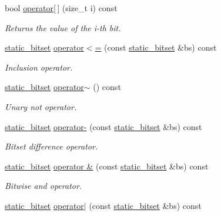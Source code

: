 \begin{DoxyCompactItemize}
\mbox{\label{classlgraph_1_1utils_1_1static__bitset_ac992361d2d5264ce8382f2e44ee939fb}} 
bool \hyperlink{classlgraph_1_1utils_1_1static__bitset_ac992361d2d5264ce8382f2e44ee939fb}{operator\mbox{[}$\,$\mbox{]}} (size\+\_\+t i) const
\begin{DoxyCompactList}\small\item\em Returns the value of the i-\/th bit. \end{DoxyCompactList}\item 
\hyperlink{classlgraph_1_1utils_1_1static__bitset}{static\+\_\+bitset} \hyperlink{classlgraph_1_1utils_1_1static__bitset_a633df0acba7afd646bbbef1acd85ca49}{operator$<$=} (const \hyperlink{classlgraph_1_1utils_1_1static__bitset}{static\+\_\+bitset} \&bs) const
\begin{DoxyCompactList}\small\item\em Inclusion operator. \end{DoxyCompactList}\item 
\hyperlink{classlgraph_1_1utils_1_1static__bitset}{static\+\_\+bitset} \hyperlink{classlgraph_1_1utils_1_1static__bitset_a8bb49442a841f4a899f355fb278a9468}{operator$\sim$} () const
\begin{DoxyCompactList}\small\item\em Unary not operator. \end{DoxyCompactList}\item 
\hyperlink{classlgraph_1_1utils_1_1static__bitset}{static\+\_\+bitset} \hyperlink{classlgraph_1_1utils_1_1static__bitset_ab7ab47c906e9e08a61a48bb935594e90}{operator-\/} (const \hyperlink{classlgraph_1_1utils_1_1static__bitset}{static\+\_\+bitset} \&bs) const
\begin{DoxyCompactList}\small\item\em Bitset difference operator. \end{DoxyCompactList}\item 
\hyperlink{classlgraph_1_1utils_1_1static__bitset}{static\+\_\+bitset} \hyperlink{classlgraph_1_1utils_1_1static__bitset_ade4bed9c986a5f328535c133bfa8eee7}{operator \&} (const \hyperlink{classlgraph_1_1utils_1_1static__bitset}{static\+\_\+bitset} \&bs) const
\begin{DoxyCompactList}\small\item\em Bitwise {\itshape and} operator. \end{DoxyCompactList}\item 
\hyperlink{classlgraph_1_1utils_1_1static__bitset}{static\+\_\+bitset} \hyperlink{classlgraph_1_1utils_1_1static__bitset_a8b0ee09d74157739ac96995b6a07b29f}{operator$\vert$} (const \hyperlink{classlgraph_1_1utils_1_1static__bitset}{static\+\_\+bitset} \&bs) const

\end{DoxyCompactItemize}
